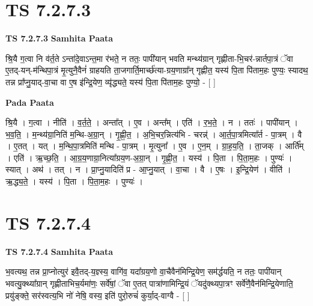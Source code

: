 \documentclass[17pt]{extarticle}
\begin{document}

\section{ TS 7.2.7.3 }

\textbf{TS 7.2.7.3 } \newline
\textbf{Samhita Paata} \newline

श्रि॒यै ग॒त्वा नि व॑र्त॒ते ऽन्ता॑दे॒वाऽन्त॒मा र॑भते॒ न ततः॒ पापी॑यान् भवति मन्थ्य॑ग्रान् गृह्णीता-भि॒चर॑-न्नार्तपा॒त्रं ॅवा ए॒तद्-यन्-म॑न्थिपा॒त्रं मृ॒त्युनै॒वैनं॑ ग्राहयति ता॒जगार्ति॒मार्च्छ॑त्या-ग्रय॒णाग्रा᳚न् गृह्णीत॒ यस्य॑ पि॒ता पि॑ताम॒हः पुण्यः॒ स्यादथ॒ तन्न प्रा᳚प्नु॒याद्-वा॒चा वा ए॒ष इ॑न्द्रि॒येण॒ व्यृ॑द्ध्यते॒ यस्य॑ पि॒ता पि॑ताम॒हः पुण्यो॒ - [  ] \newline

\textbf{Pada Paata} \newline

श्रि॒यै । ग॒त्वा । नीति॑ । व॒र्त॒ते॒ । अन्ता᳚त् । ए॒व । अन्त᳚म् । एति॑ । र॒भ॒ते॒ । न । ततः॑ । पापी॑यान् । भ॒व॒ति॒ । म॒न्थ्य॑ग्रा॒निति॑ म॒न्थि-अ॒ग्रा॒न् । गृ॒ह्णी॒त॒ । अ॒भि॒चर॒न्नित्य॑भि - चरन्न्॑ । आ॒र्त॒पा॒त्रमित्या᳚र्त - पा॒त्रम् । वै । ए॒तत् । यत् । म॒न्थि॒पा॒त्रमिति॑ मन्थि - पा॒त्रम् । मृ॒त्युना᳚ । ए॒व । ए॒न॒म् । ग्रा॒ह॒य॒ति॒ । ता॒जक् । आर्ति᳚म् । एति॑ । ऋ॒च्छ॒ति॒ । आ॒ग्र॒य॒णाग्रा॒नित्या᳚ग्रय॒ण-अ॒ग्रा॒न् । गृ॒ह्णी॒त॒ । यस्य॑ । पि॒ता । पि॒ता॒म॒हः । पुण्यः॑ । स्यात् । अथ॑ । तत् । न । प्रा॒प्नु॒यादिति॑ प्र - आ॒प्नु॒यात् । वा॒चा । वै । ए॒षः । इ॒न्द्रि॒येण॑ । वीति॑ । ऋ॒द्ध्य॒ते॒ । यस्य॑ । पि॒ता । पि॒ता॒म॒हः । पुण्यः॑ ।  \newline





\section{ TS 7.2.7.4 }

\textbf{TS 7.2.7.4 } \newline
\textbf{Samhita Paata} \newline

भ॒वत्यथ॒ तन्न प्रा॒प्नोत्युर॑ इवै॒तद्-य॒ज्ञ्स्य॒ वागि॑व॒ यदा᳚ग्रय॒णो वा॒चैवैन॑मिन्द्रि॒येण॒ सम॑र्द्धयति॒ न ततः॒ पापी॑यान् भवत्यु॒क्थ्या᳚ग्रान् गृह्णीताभिच॒र्यमा॑णः॒ सर्वे॑षां॒ ॅवा ए॒तत् पात्रा॑णामिन्द्रि॒यं ॅयदु॑क्थ्यपा॒त्रꣳ सर्वे॑णै॒वैन॑मिन्द्रि॒येणाति॒ प्रयु॑ङ्क्ते॒ सर॑स्वत्य॒भि नो॑ नेषि॒ वस्य॒ इति॑ पुरो॒रुचं॑ कुर्या॒द्-वाग्वै - [  ] \newline
\end{document}
